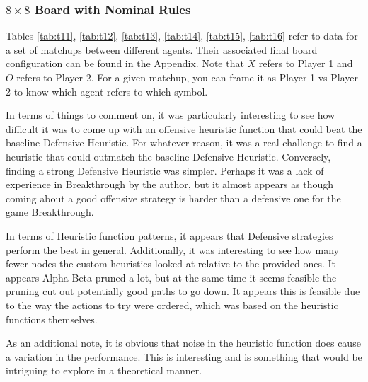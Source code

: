 \documentclass{article}[12pt]
\begin{document}
   \subsubsection{$8 \times 8$ Board with Nominal Rules}
   Tables \ref{tab:t11}, \ref{tab:t12}, \ref{tab:t13}, \ref{tab:t14}, \ref{tab:t15}, \ref{tab:t16} refer to data for a set of matchups between different agents. Their associated final board configuration can be found in the Appendix. Note that $X$ refers to Player 1 and $O$ refers to Player 2. For a given matchup, you can frame it as Player 1 vs Player 2 to know which agent refers to which symbol.
   
   In terms of things to comment on, it was particularly interesting to see how difficult it was to come up with an offensive heuristic function that could beat the baseline Defensive Heuristic. For whatever reason, it was a real challenge to find a heuristic that could outmatch the baseline Defensive Heuristic. Conversely, finding a strong Defensive Heuristic was simpler. Perhaps it was a lack of experience in Breakthrough by the author, but it almost appears as though coming about a good offensive strategy is harder than a defensive one for the game Breakthrough.
   
   In terms of Heuristic function patterns, it appears that Defensive strategies perform the best in general. Additionally, it was interesting to see how many fewer nodes the custom heuristics looked at relative to the provided ones. It appears Alpha-Beta pruned a lot, but at the same time it seems feasible the pruning cut out potentially good paths to go down. It appears this is feasible due to the way the actions to try were ordered, which was based on the heuristic functions themselves. 
   
   As an additional note, it is obvious that noise in the heuristic function does cause a variation in the performance. This is interesting and is something that would be intriguing to explore in a theoretical manner.
    
\end{document}
